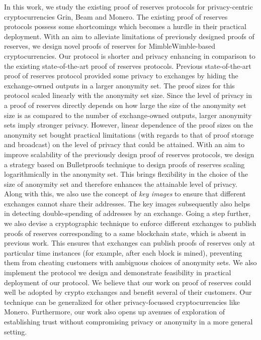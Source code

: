 \begin{Abstract}
In this work, we study the existing proof of reserves protocols for privacy-centric cryptocurrencies Grin, Beam and Monero.
The existing proof of reserves protocols possess some shortcomings which becomes a hurdle in their practical deployment.
With an aim to alleviate limitations of previously designed proofs of reserves, we design novel proofs of reserves for MimbleWimble-based cryptocurrencies.
Our protocol is shorter and privacy enhancing in comparison to the existing state-of-the-art proof of reserves protocols.
Previous state-of-the-art proof of reserves protocol provided some privacy to exchanges by hiding the exchange-owned outputs in a larger anonymity set. 
The proof sizes for this protocol scaled linearly with the anonymity set size.
Since the level of privacy in a proof of reserves directly depends on how large the size of the anonymity set size is as compared to the number of exchange-owned outputs, larger anonymity sets imply stronger privacy.
However, linear dependence of the proof sizes on the anonymity set bought practical limitations (with regards to that of proof storage and broadcast) on the level of privacy that could be attained.  
With an aim to improve scalability of the previously design proof of reserves protocols, we design a strategy based on Bulletproofs technique \cite{Bunz2018} to design proofs of reserves scaling logarithmically in the anonymity set.
This brings flexibility in the choice of the size of anonymity set and therefore enhances the attainable level of privacy.
Along with this, we also use the concept of \textit{key images} to ensure that different exchanges cannot share their addresses.
The key images subsequently also helps in detecting double-spending of addresses by an exchange.
Going a step further, we also devise a cryptographic technique to enforce different exchanges to publish proofs of reserves corresponding to a same blockchain state, which is absent in previous work.
This ensures that exchanges can publish proofs of reserves only at particular time instances (for example, after each block is mined), preventing them from cheating customers with ambiguous choices of anonymity sets.   
We also implement the protocol we design and demonstrate feasibility in practical deployment of our protocol.
We believe that our work on proof of reserves could well be adopted by crypto exchanges and benefit several of their customers.
Our technique can be generalized for other privacy-focussed cryptocurrencies like Monero.
Furthermore, our work also opens up avenues of exploration of establishing trust without compromising privacy or anonymity in a more general setting.


\end{Abstract}
